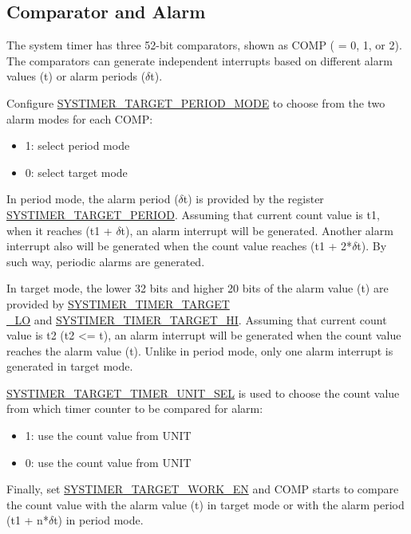 \documentclass[main\_\_EN.tex]{subfiles}
\begin{document}
\subsection{Comparator and Alarm}
The system timer has three 52-bit comparators, shown as COMP ( = 0, 1, or 2). The comparators can generate independent interrupts based on different alarm values (t) or alarm periods ($\delta$t).

Configure \hyperref[fielddesc:SYSTIMERTARGET0PERIODMODE]{SYSTIMER\_TARGET\_PERIOD\_MODE} to choose from the two alarm modes for each COMP:
\begin{itemize}
    \item 1: select period mode
    \item 0: select target mode
\end{itemize}

In period mode, the alarm period ($\delta$t) is provided by the register \hyperref[fielddesc:SYSTIMERTARGET2PERIOD]{SYSTIMER\_TARGET\_PERIOD}. Assuming that current count value is t1, when it reaches (t1 + $\delta$t), an alarm interrupt will be generated. Another alarm interrupt also will be generated when the count value reaches (t1 + 2*$\delta$t). By such way, periodic alarms are generated.

In target mode, the lower 32 bits and higher 20 bits of the alarm value (t) are provided by  \hyperref[fielddesc:SYSTIMERTIMERTARGET0LO]{SYSTIMER\_TIMER\_TARGET\\\_LO} and \hyperref[fielddesc:SYSTIMERTIMERTARGET0HI]{SYSTIMER\_TIMER\_TARGET\_HI}. Assuming that current count value is t2 (t2 <= t), an alarm interrupt will be generated when the count value reaches the alarm value (t). Unlike in period mode, only one alarm interrupt is generated in target mode.

\hyperref[fielddesc:SYSTIMERTARGET0TIMERUNITSEL]{SYSTIMER\_TARGET\_TIMER\_UNIT\_SEL} is used to choose the count value from which timer counter to be compared for alarm:

\begin{itemize}
        \item 1: use the count value from UNIT
        \item 0: use the count value from UNIT
\end{itemize}

Finally, set \hyperref[fielddesc:SYSTIMERTARGET0WORKEN]{SYSTIMER\_TARGET\_WORK\_EN} and COMP starts to compare the count value with the alarm value (t) in target mode or with the alarm period (t1 + n*$\delta$t) in period mode.
\end{document}

